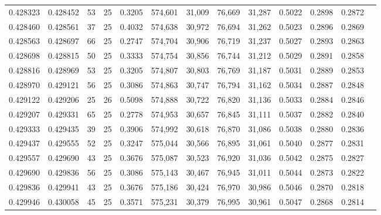 \begin{tabular}{rrrrrrrrrrrrr}
0.428323 & 0.428452 &    53 &  25 &                                     0.3205 & 574,601 &  31,009 &  76,669 &  31,287 & 0.5022 & 0.2898 & 0.2872 \\
0.428460 & 0.428561 &    37 &  25 &                                     0.4032 & 574,638 &  30,972 &  76,694 &  31,262 & 0.5023 & 0.2896 & 0.2869 \\
0.428563 & 0.428697 &    66 &  25 &                                     0.2747 & 574,704 &  30,906 &  76,719 &  31,237 & 0.5027 & 0.2893 & 0.2863 \\
0.428698 & 0.428815 &    50 &  25 &                                     0.3333 & 574,754 &  30,856 &  76,744 &  31,212 & 0.5029 & 0.2891 & 0.2858 \\
0.428816 & 0.428969 &    53 &  25 &                                     0.3205 & 574,807 &  30,803 &  76,769 &  31,187 & 0.5031 & 0.2889 & 0.2853 \\
0.428970 & 0.429121 &    56 &  25 &                                     0.3086 & 574,863 &  30,747 &  76,794 &  31,162 & 0.5034 & 0.2887 & 0.2848 \\
0.429122 & 0.429206 &    25 &  26 &                                     0.5098 & 574,888 &  30,722 &  76,820 &  31,136 & 0.5033 & 0.2884 & 0.2846 \\
0.429207 & 0.429331 &    65 &  25 &                                     0.2778 & 574,953 &  30,657 &  76,845 &  31,111 & 0.5037 & 0.2882 & 0.2840 \\
0.429333 & 0.429435 &    39 &  25 &                                     0.3906 & 574,992 &  30,618 &  76,870 &  31,086 & 0.5038 & 0.2880 & 0.2836 \\
0.429437 & 0.429555 &    52 &  25 &                                     0.3247 & 575,044 &  30,566 &  76,895 &  31,061 & 0.5040 & 0.2877 & 0.2831 \\
0.429557 & 0.429690 &    43 &  25 &                                     0.3676 & 575,087 &  30,523 &  76,920 &  31,036 & 0.5042 & 0.2875 & 0.2827 \\
0.429690 & 0.429836 &    56 &  25 &                                     0.3086 & 575,143 &  30,467 &  76,945 &  31,011 & 0.5044 & 0.2873 & 0.2822 \\
0.429836 & 0.429941 &    43 &  25 &                                     0.3676 & 575,186 &  30,424 &  76,970 &  30,986 & 0.5046 & 0.2870 & 0.2818 \\
0.429946 & 0.430058 &    45 &  25 &                                     0.3571 & 575,231 &  30,379 &  76,995 &  30,961 & 0.5047 & 0.2868 & 0.2814 \\

\end{tabular}
